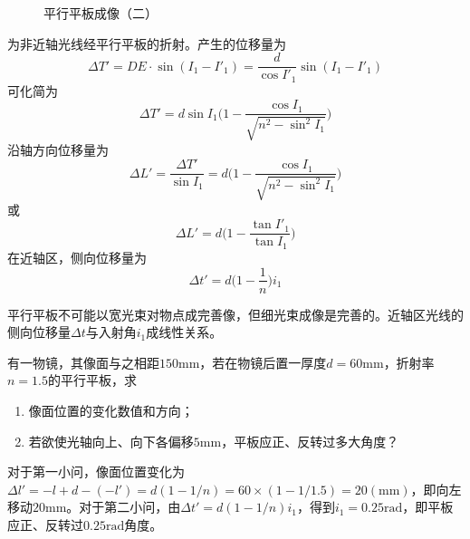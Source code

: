 \documentclass[cn,10pt,chinesefont=founder,math=newtx,cite=super,twoside]{elegantbook}
\begin{document}
\begin{figure}[htbp]
\begin{minipage}[t]{0.48\textwidth}
		\caption{平行平板成像（二）}
		\label{fig:parallel-plate-2}
	\end{minipage}
\end{figure}

 为非近轴光线经平行平板的折射。产生的位移量为
\begin{equation}
\Delta T'=DE\cdot\sin(I_1-I'_1)=\frac{d}{\cos{I'_1}}\sin(I_1-I'_1)
\end{equation}
可化简为
\begin{equation}
\Delta T'=d\sin I_1\bigg(1-\frac{\cos I_1}{\sqrt{n^2-\sin^2 I_1}}\bigg)
\end{equation}
沿轴方向位移量为
\begin{equation}
\Delta L'=\frac{\Delta T'}{\sin I_1}=d\bigg(1-\frac{\cos I_1}{\sqrt{n^2-\sin^2 I_1}}\bigg)
\end{equation}
或
\begin{equation}
\Delta L'=d\bigg(1-\frac{\tan I'_1}{\tan I_1}\bigg)
\end{equation}
在近轴区，侧向位移量为
\begin{equation}
\Delta t'=d\bigg(1-\frac{1}{n}\bigg)i_1
\end{equation}

\begin{note}
	平行平板不可能以宽光束对物点成完善像，但细光束成像是完善的。近轴区光线的侧向位移量$\Delta t$与入射角$i_1$成线性关系。
\end{note}

\begin{problem}
	有一物镜，其像面与之相距$150\mathrm{mm}$，若在物镜后置一厚度$d=60\mathrm{mm}$，折射率$n=1.5$的平行平板，求
	\begin{enumerate}
		\item 像面位置的变化数值和方向；
		\item 若欲使光轴向上、向下各偏移$5\mathrm{mm}$，平板应正、反转过多大角度？
	\end{enumerate}
\end{problem}
\begin{solution}
	对于第一小问，像面位置变化为$\Delta l'=-l+d-(-l')=d(1-1/n)=60\times(1-1/1.5)=20(\mathrm{mm})$，即向左移动$20\mathrm{mm}$。对于第二小问，由$\Delta t'=d(1-1/n)i_1$，得到$i_1=0.25\mathrm{rad}$，即平板应正、反转过$0.25\mathrm{rad}$角度。
\end{solution}
\end{document}
